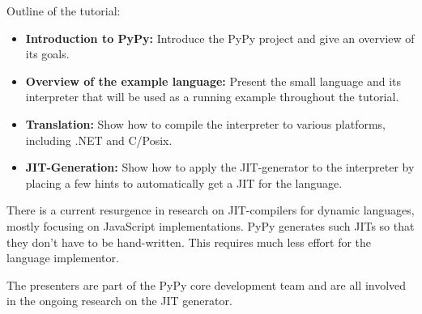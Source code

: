 \documentclass{llncs}
\begin{document}
Outline of the tutorial:
\begin{itemize}
 \item \textbf{Introduction to PyPy:} Introduce the PyPy project and give an
 overview of its goals.
 \item \textbf{Overview of the example language:} Present the small language and
 its interpreter that will be used as a running example throughout the tutorial.
 \item \textbf{Translation:} Show how to compile the interpreter to various
 platforms, including .NET and C/Posix.
 \item \textbf{JIT-Generation:} Show how to apply the JIT-generator to the
 interpreter by placing a few hints to automatically get a JIT for the language.
\end{itemize}


There is a current resurgence in research on JIT-compilers for dynamic
languages, mostly focusing on JavaScript implementations. PyPy generates such
JITs so that they don't have to be hand-written. This requires much less effort
for the language implementor.

The presenters are part of the PyPy core development team and are all involved
in the ongoing research on the JIT generator. 



\end{document}
